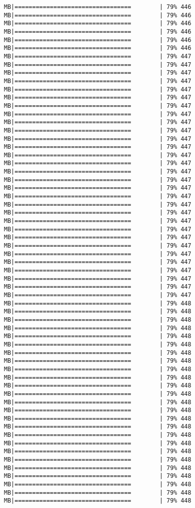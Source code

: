 \documentclass[
]{article}
\begin{document}
\begin{verbatim}
MB|=================================        | 79% 446 MB|=================================        | 79% 446 MB|=================================        | 79% 446 MB|=================================        | 79% 446 MB|=================================        | 79% 446 MB|=================================        | 79% 446 MB|=================================        | 79% 447 MB|=================================        | 79% 447 MB|=================================        | 79% 447 MB|=================================        | 79% 447 MB|=================================        | 79% 447 MB|=================================        | 79% 447 MB|=================================        | 79% 447 MB|=================================        | 79% 447 MB|=================================        | 79% 447 MB|=================================        | 79% 447 MB|=================================        | 79% 447 MB|=================================        | 79% 447 MB|=================================        | 79% 447 MB|=================================        | 79% 447 MB|=================================        | 79% 447 MB|=================================        | 79% 447 MB|=================================        | 79% 447 MB|=================================        | 79% 447 MB|=================================        | 79% 447 MB|=================================        | 79% 447 MB|=================================        | 79% 447 MB|=================================        | 79% 447 MB|=================================        | 79% 447 MB|=================================        | 79% 447 MB|=================================        | 79% 447 MB|=================================        | 79% 447 MB|=================================        | 79% 447 MB|=================================        | 79% 447 MB|=================================        | 79% 447 MB|=================================        | 79% 447 MB|=================================        | 79% 448 MB|=================================        | 79% 448 MB|=================================        | 79% 448 MB|=================================        | 79% 448 MB|=================================        | 79% 448 MB|=================================        | 79% 448 MB|=================================        | 79% 448 MB|=================================        | 79% 448 MB|=================================        | 79% 448 MB|=================================        | 79% 448 MB|=================================        | 79% 448 MB|=================================        | 79% 448 MB|=================================        | 79% 448 MB|=================================        | 79% 448 MB|=================================        | 79% 448 MB|=================================        | 79% 448 MB|=================================        | 79% 448 MB|=================================        | 79% 448 MB|=================================        | 79% 448 MB|=================================        | 79% 448 MB|=================================        | 79% 448 MB|=================================        | 79% 448 MB|=================================        | 79% 448 MB|=================================        | 79% 448 MB|=================================        | 79% 448 
\end{verbatim}
\end{document}
